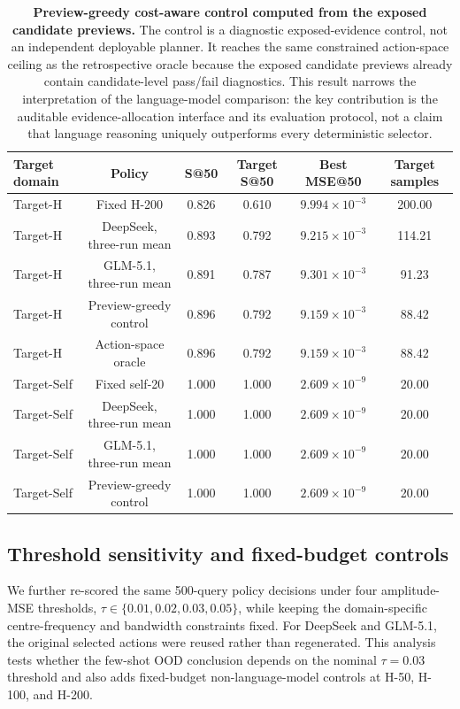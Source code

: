 \documentclass[final,1p,times]{elsarticle}
\begin{document}
\begin{table}[htbp!]
\centering
\caption{\textbf{Preview-greedy cost-aware control computed from the exposed candidate previews.}
The control is a diagnostic exposed-evidence control, not an independent deployable planner. It reaches the same constrained action-space ceiling as the retrospective oracle because the exposed candidate previews already contain candidate-level pass/fail diagnostics. This result narrows the interpretation of the language-model comparison: the key contribution is the auditable evidence-allocation interface and its evaluation protocol, not a claim that language reasoning uniquely outperforms every deterministic selector.}
\label{tab:si_preview_greedy_control}
\small
\setlength{\tabcolsep}{5pt}
\renewcommand{\arraystretch}{1.12}
\begin{tabular}{lccccc}
\toprule
Target domain & Policy & S@50 & Target S@50 & Best MSE@50 & Target samples \\
\midrule
Target-H & Fixed H-200 & 0.826 & 0.610 & $9.994\times10^{-3}$ & 200.00 \\
Target-H & DeepSeek, three-run mean & 0.893 & 0.792 & $9.215\times10^{-3}$ & 114.21 \\
Target-H & GLM-5.1, three-run mean & 0.891 & 0.787 & $9.301\times10^{-3}$ & 91.23 \\
Target-H & Preview-greedy control & 0.896 & 0.792 & $9.159\times10^{-3}$ & 88.42 \\
Target-H & Action-space oracle & 0.896 & 0.792 & $9.159\times10^{-3}$ & 88.42 \\
\midrule
Target-Self & Fixed self-20 & 1.000 & 1.000 & $2.609\times10^{-9}$ & 20.00 \\
Target-Self & DeepSeek, three-run mean & 1.000 & 1.000 & $2.609\times10^{-9}$ & 20.00 \\
Target-Self & GLM-5.1, three-run mean & 1.000 & 1.000 & $2.609\times10^{-9}$ & 20.00 \\
Target-Self & Preview-greedy control & 1.000 & 1.000 & $2.609\times10^{-9}$ & 20.00 \\
\bottomrule
\end{tabular}
\end{table}

\subsection{Threshold sensitivity and fixed-budget controls}

We further re-scored the same 500-query policy decisions under four amplitude-MSE thresholds, $\tau \in \{0.01,0.02,0.03,0.05\}$, while keeping the domain-specific centre-frequency and bandwidth constraints fixed. For DeepSeek and GLM-5.1, the original selected actions were reused rather than regenerated. This analysis tests whether the few-shot OOD conclusion depends on the nominal $\tau=0.03$ threshold and also adds fixed-budget non-language-model controls at H-50, H-100, and H-200.
\end{document}

